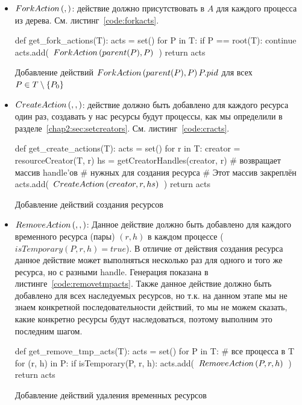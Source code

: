 \begin{itemize}
	\item $ForkAction\left( ,  \right)$: действие должно присутствовать в $A$ для каждого процесса из дерева. См. листинг~\ref{code:forkacts}.

\begin{listing}[ht!]
\begin{pythoncode}
def get_fork_actions(T):
    acts = set()
    for P in T:
        if P == root(T):
            continue
        acts.add(~$\crfork{parent(P)}{P}$~)
    return acts
\end{pythoncode}
\caption{Добавление действий $\crfork{parent(P)}{P}{P.pid}$ для всех $P \in T \setminus \xbrace{P_0}$}
\label{code:forkacts}
\end{listing}

	\item $CreateAction\left( , ,  \right)$: действие должно быть добавлено для каждого ресурса один раз, создавать у нас ресурсы будут процессы, как мы определили в разделе~\ref{chap2:sec:setcreators}. См. листинг~\ref{code:cracts}.

\begin{listing}[ht!]
\begin{pythoncode}
def get_create_actions(T):
    acts = set()
    for r in T:
        creator = resourceCreator(T, r)
        hs = getCreatorHandles(creator, r)   # возвращает массив handle'ов
                                             # нужных для создания ресурса
                                             # Этот массив закреплён
        acts.add(~$\crcreate{creator}{r}{hs}$~)
    return acts
\end{pythoncode}
\caption{Добавление действий создания ресурсов}
\label{code:cracts}
\end{listing}


	\item $RemoveAction\left( , ,  \right)$: Данное действие должно быть добавлено для каждого временного ресурса (пары) $(r, h)$ в каждом процессе ($isTemporary(P, r, h) = true$). В отличие от действия создания ресурса данное действие может выполняться несколько раз для одного и того же ресурса, но с разными handle. Генерация показана в листинге~\ref{code:removetmpacts}. Также данное действие должно быть добавлено для всех наследуемых ресурсов, но т.к. на данном этапе мы не знаем конкретной последовательности действий, то мы не можем сказать, какие конкретно ресурсы будут наследоваться, поэтому выполним это последним шагом.  

\begin{listing}[ht!]
\begin{pythoncode}
def get_remove_tmp_acts(T):
    acts = set()
    for P in T:  # все процесса в T
        for (r, h) in P:
            if isTemporary(P, r, h):
                acts.add(~$\crremove{P}{r}{h}$~)
    return acts
\end{pythoncode}
\caption{Добавление действий удаления временных ресурсов}
\label{code:removetmpacts}
\end{listing}


\end{itemize}
